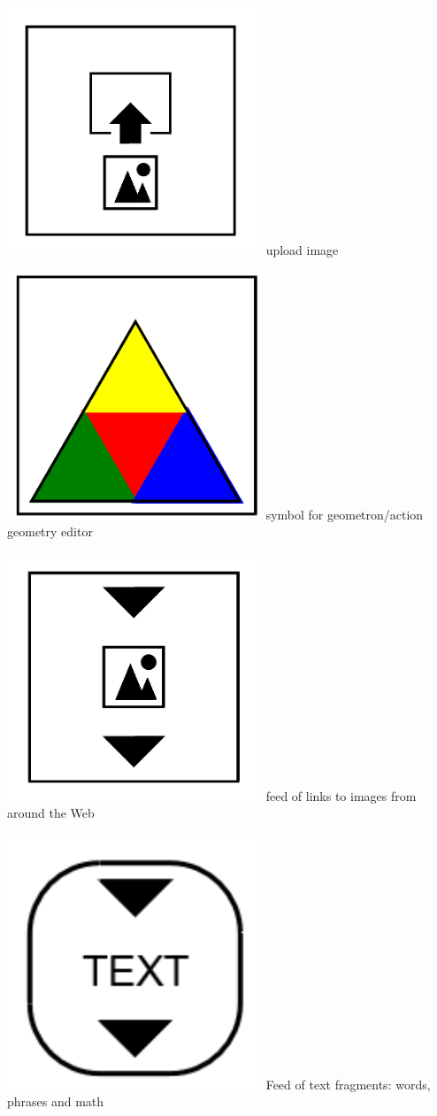 \documentclass[11pt]{article}
\begin{document}
\includegraphics[width=3in]{image1.png}
upload image

\includegraphics[width=3in]{image2.png}
symbol for geometron/action geometry editor

\includegraphics[width=3in]{image3.png}
feed of links to images from around the Web

\includegraphics[width=3in]{image4.png}
Feed of text fragments: words, phrases and math
\end{document}
